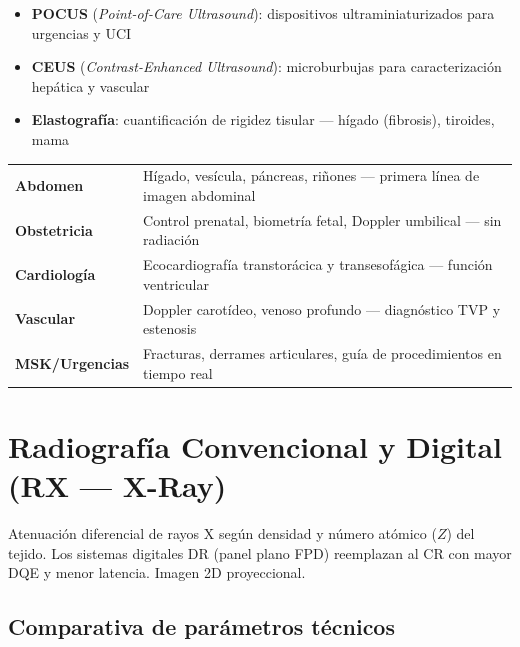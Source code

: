 \documentclass[11pt, a4paper]{article}
\begin{document}
\begin{itemize}[leftmargin=*, itemsep=2pt, topsep=4pt]
  \footnotesize
  \item \textbf{POCUS} (\textit{Point-of-Care Ultrasound}): dispositivos ultraminiaturizados para urgencias y UCI
  \item \textbf{CEUS} (\textit{Contrast-Enhanced Ultrasound}): microburbujas para caracterización hepática y vascular
  \item \textbf{Elastografía}: cuantificación de rigidez tisular --- hígado (fibrosis), tiroides, mama
\end{itemize}

\begin{clinicbox}
\begin{tabular}{@{}P{3cm} P{10.5cm}@{}}
\textbf{Abdomen}       & Hígado, vesícula, páncreas, riñones --- primera línea de imagen abdominal \\[2pt]
\textbf{Obstetricia}   & Control prenatal, biometría fetal, Doppler umbilical --- sin radiación \\[2pt]
\textbf{Cardiología}   & Ecocardiografía transtorácica y transesofágica --- función ventricular \\[2pt]
\textbf{Vascular}      & Doppler carotídeo, venoso profundo --- diagnóstico TVP y estenosis \\[2pt]
\textbf{MSK/Urgencias} & Fracturas, derrames articulares, guía de procedimientos en tiempo real \\
\end{tabular}
\end{clinicbox}

\newpage

\section{Radiografía Convencional y Digital (RX --- X-Ray)}

\begin{principiobox}
Atenuación diferencial de rayos X según densidad y número atómico ($Z$) del tejido.
Los sistemas digitales DR (panel plano FPD) reemplazan al CR con mayor DQE y menor latencia.
Imagen 2D proyeccional.
\end{principiobox}

\subsection{Comparativa de parámetros técnicos}
\end{document}
